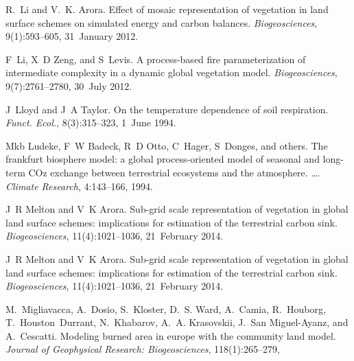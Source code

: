 \begin{DoxyDescription}
\item[\label{_CITEREF_Li2012-f7f}%
\mbox{[}32\mbox{]}]R.~Li and V.~K. Arora. Effect of mosaic representation of vegetation in land surface schemes on simulated energy and carbon balances. {\itshape Biogeosciences}, 9(1)\+:593--605, 31~January 2012. 


\item[\label{_CITEREF_Li20121c2}%
\mbox{[}33\mbox{]}]F~Li, X~D Zeng, and S~Levis. A process-\/based fire parameterization of intermediate complexity in a dynamic global vegetation model. {\itshape Biogeosciences}, 9(7)\+:2761--2780, 30~July 2012. 


\item[\label{_CITEREF_Lloyd1994-ct}%
\mbox{[}34\mbox{]}]J~Lloyd and J~A Taylor. On the temperature dependence of soil respiration. {\itshape Funct. Ecol.}, 8(3)\+:315--323, 1~June 1994. 


\item[\label{_CITEREF_Ludeke1994-px}%
\mbox{[}35\mbox{]}]Mkb Ludeke, F~W Badeck, R~D Otto, C~Hager, S~Donges, and others. The frankfurt biosphere model\+: a global process-\/oriented model of seasonal and long-\/term C\+Oz exchange between terrestrial ecosystems and the atmosphere. …. {\itshape Climate Research}, 4\+:143--166, 1994.


\item[\label{_CITEREF_Melton2014-xk}%
\mbox{[}36\mbox{]}]J~R Melton and V~K Arora. Sub-\/grid scale representation of vegetation in global land surface schemes\+: implications for estimation of the terrestrial carbon sink. {\itshape Biogeosciences}, 11(4)\+:1021--1036, 21~February 2014. 


\item[\label{_CITEREF_Melton2014-xy}%
\mbox{[}37\mbox{]}]J~R Melton and V~K Arora. Sub-\/grid scale representation of vegetation in global land surface schemes\+: implications for estimation of the terrestrial carbon sink. {\itshape Biogeosciences}, 11(4)\+:1021--1036, 21~February 2014. 


\item[\label{_CITEREF_Migliavacca2013-eh}%
\mbox{[}38\mbox{]}]M.~Migliavacca, A.~Dosio, S.~Kloster, D.~S. Ward, A.~Camia, R.~Houborg, T.~Houston~Durrant, N.~Khabarov, A.~A. Krasovskii, J.~San Miguel-\/\+Ayanz, and A.~Cescatti. Modeling burned area in europe with the community land model. {\itshape Journal of Geophysical Research\+: Biogeosciences}, 118(1)\+:265--279,
\begin{DoxyEnumerate}
\item 
\end{DoxyEnumerate}



\end{DoxyDescription}
